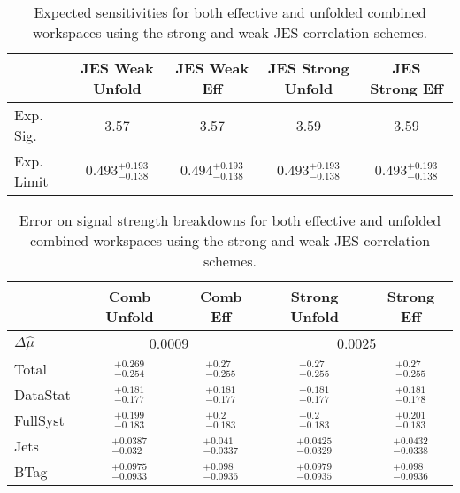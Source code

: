 \begin{table}[!htbp]\captionsetup{justification=centering}
\begin{center}\begin{tabular}{lcccc}
\hline\hline
 & JES Weak Unfold & JES Weak Eff & JES Strong Unfold & JES Strong Eff\\
\hline
Exp. Sig. & 3.57 & 3.57 & 3.59 & 3.59\\
\hline
Exp. Limit & $0.493^{+0.193}_{-0.138}$ & $0.494^{+0.193}_{-0.138}$ & $0.493^{+0.193}_{-0.138}$ & $0.493^{+0.193}_{-0.138}$\\
\hline\hline
\end{tabular}
\caption{Expected sensitivities for both effective and unfolded combined workspaces using the strong and weak JES correlation schemes.}
\label{tab:sw_jes_sensitivities}
\end{center}
\end{table}

\begin{table}[!htbp]\captionsetup{justification=centering}
\begin{center}\begin{tabular}{lcccc}
\hline
 & Comb Unfold & Comb Eff & Strong Unfold & Strong Eff\\
\hline\hline
$\Delta\hat{\mu}$ &  \multicolumn{2}{|c|}{0.0009} &  \multicolumn{2}{|c|}{0.0025}\\
\hline
Total &  $^{+ 0.269}_{-0.254}$ &  $^{+ 0.27}_{-0.255}$ &  $^{+ 0.27}_{-0.255}$ &  $^{+ 0.27}_{-0.255}$\\
\hline
DataStat &  $^{+ 0.181}_{-0.177}$ &  $^{+ 0.181}_{-0.177}$ &  $^{+ 0.181}_{-0.177}$ &  $^{+ 0.181}_{-0.178}$\\
\hline
FullSyst &  $^{+ 0.199}_{-0.183}$ &  $^{+ 0.2}_{-0.183}$ &  $^{+ 0.2}_{-0.183}$ &  $^{+ 0.201}_{-0.183}$\\
\hline
Jets &  $^{+ 0.0387}_{-0.032}$ &  $^{+ 0.041}_{-0.0337}$ &  $^{+ 0.0425}_{-0.0329}$ &  $^{+ 0.0432}_{-0.0338}$\\
\hline
BTag &  $^{+ 0.0975}_{-0.0933}$ &  $^{+ 0.098}_{-0.0936}$ &  $^{+ 0.0979}_{-0.0935}$ &  $^{+ 0.098}_{-0.0936}$\\
\hline\hline
\end{tabular}
\caption{Error on signal strength breakdowns for both effective and unfolded combined workspaces using the strong and weak JES correlation schemes.}

\label{tab:sw_jes_breakdowns}\end{center}
\end{table}

